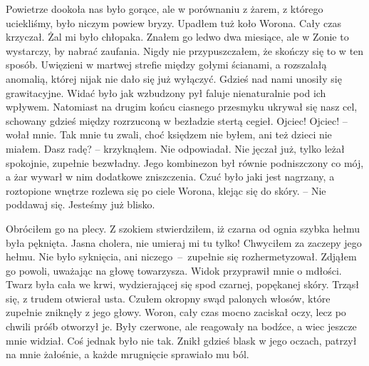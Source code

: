 \documentclass[../MAIN.tex]{subfiles}
\begin{document}
Powietrze dookoła nas było gorące, ale w porównaniu z żarem, z którego uciekliśmy, było niczym powiew bryzy. Upadłem tuż koło Worona. Cały czas krzyczał. Żal mi było chłopaka. Znałem go ledwo dwa miesiące, ale w Zonie to wystarczy, by nabrać zaufania. Nigdy nie przypuszczałem, że skończy się to w ten sposób. Uwięzieni w martwej strefie między gołymi ścianami, a rozszalałą anomalią, której nijak nie dało się już wyłączyć. Gdzieś nad nami unosiły się grawitacyjne. Widać było jak wzbudzony pył faluje nienaturalnie pod ich wpływem. Natomiast na drugim końcu ciasnego przesmyku ukrywał się nasz cel, schowany gdzieś między rozrzuconą w bezładzie stertą cegieł.
\sd
\xx Ojciec! Ojciec! – wołał mnie. Tak mnie tu zwali, choć księdzem nie byłem, ani też dzieci nie miałem.
\xx Dasz radę? – krzyknąłem.
\qd
Nie odpowiadał. Nie jęczał już, tylko leżał spokojnie, zupełnie bezwładny. Jego kombinezon był równie podniszczony co mój, a żar wywarł w nim dodatkowe zniszczenia. Czuć było jaki jest nagrzany, a roztopione wnętrze rozlewa się po ciele Worona, klejąc się do skóry. – Nie poddawaj się. Jesteśmy już blisko.

Obróciłem go na plecy. Z szokiem stwierdziłem, iż czarna od ognia szybka hełmu była pęknięta.
\sd
\xx Jasna cholera, nie umieraj mi tu tylko!
\qd
Chwyciłem za zaczepy jego hełmu. Nie było syknięcia, ani niczego~--~zupełnie się rozhermetyzował. Zdjąłem go powoli, uważając na głowę towarzysza. Widok przyprawił mnie o mdłości. Twarz była cała we krwi, wydzierającej się spod czarnej, popękanej skóry. Trząsł się, z trudem otwierał usta. Czułem okropny swąd palonych włosów, które zupełnie zniknęły z jego głowy. Woron, cały czas mocno zaciskał oczy, lecz po chwili próśb otworzył je. Były czerwone, ale reagowały na bodźce, a wiec jeszcze mnie widział. Coś jednak było nie tak. Znikł gdzieś blask w jego oczach, patrzył na mnie żałośnie, a każde mrugnięcie sprawiało mu ból.
\end{document}
